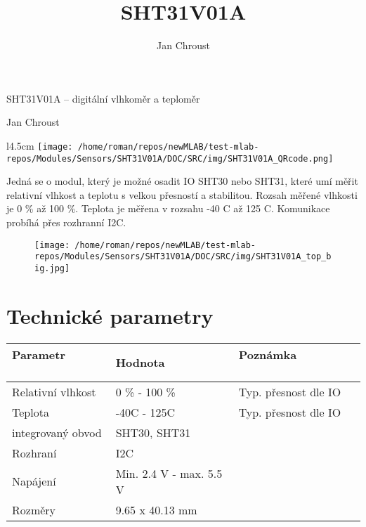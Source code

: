 \documentclass[12pt,a4paper]{article}
\author{ Jan Chroust }
\title{ SHT31V01A }
\begin{document}
\fontsize{14.4}{20}\selectfont

\vspace*{\fill}

\begin{center}
{\Huge SHT31V01A – digitální vlhkoměr a teploměr}

{\Large Jan Chroust}

\vspace*{\fill}
\vspace*{1cm}

\end{center}
\begin{wrapfigure}{l}{4.5cm}
    \texttt{[image: /home/roman/repos/newMLAB/test-mlab-repos/Modules/Sensors/SHT31V01A/DOC/SRC/img/SHT31V01A\_QRcode.png]}
\end{wrapfigure}

Jedná se o modul, který je možné osadit IO SHT30 nebo SHT31, které umí
měřit relativní vlhkost a teplotu s velkou přesností a stabilitou.
Rozsah měřené vlhkosti je 0 \% až 100 \%. Teplota je měřena v rozsahu
-40 C až 125 C. Komunikace probíhá přes rozhranní I2C.


\vspace*{\fill}
\vfill
\vspace*{1cm}

\begin{figure}[ht!]
\centering
\texttt{[image: /home/roman/repos/newMLAB/test-mlab-repos/Modules/Sensors/SHT31V01A/DOC/SRC/img/SHT31V01A\_top\_big.jpg]} 
\end{figure}
\vspace*{1cm}

\vspace*{\fill}
\vfill
\section{Technické parametry}\label{technickuxe9-parametry}

\begin{longtable}[c]{@{}lll@{}}
\toprule
Parametr ~ ~ ~ ~ & Hodnota ~ ~ ~ & Poznámka ~ ~ ~ ~ ~ ~\tabularnewline
\midrule
\endhead
Relativní vlhkost & 0 \% - 100 \% ~ & Typ. přesnost dle
IO\tabularnewline
Teplota ~ ~ ~ ~ ~ & -40C - 125C ~ & Typ. přesnost dle IO\tabularnewline
integrovaný obvod & SHT30, SHT31 & ~ ~ ~ ~ ~ ~ ~ ~ ~ ~\tabularnewline
Rozhraní & I2C &\tabularnewline
Napájení & Min. 2.4 V - max. 5.5 V &\tabularnewline
Rozměry & 9.65 x 40.13 mm &\tabularnewline
\bottomrule
\end{longtable}
\end{document}
